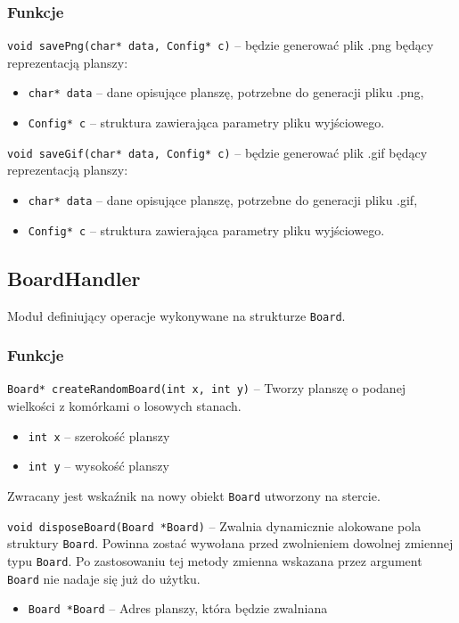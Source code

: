 \documentclass{mwart}
\begin{document}
\subsubsection{Funkcje}
\texttt{void savePng(char* data, Config* c)} -- będzie generować plik .png będący reprezentacją planszy:
\begin{itemize}[label={}]
	\item \texttt{char* data} -- dane opisujące planszę, potrzebne do generacji pliku .png,
	\item \texttt{Config* c} -- struktura zawierająca parametry pliku wyjściowego.
\end{itemize}
	
\noindent{}\texttt{void saveGif(char* data, Config* c)} -- będzie generować plik .gif będący reprezentacją planszy:
\begin{itemize}[label={}]
	\item \texttt{char* data} -- dane opisujące planszę, potrzebne do generacji pliku .gif,
	\item \texttt{Config* c} -- struktura zawierająca parametry pliku wyjściowego.
\end{itemize}


\subsection{BoardHandler}
Moduł definiujący operacje wykonywane na strukturze \texttt{Board}.

\subsubsection{Funkcje}

\texttt{Board* createRandomBoard(int x, int y)} -- Tworzy planszę o podanej wielkości z komórkami o losowych stanach.
\begin{itemize}[label={}]
	\item \texttt{int x} -- szerokość planszy
	\item \texttt{int y} -- wysokość planszy
\end{itemize}
Zwracany jest wskaźnik na nowy obiekt \texttt{Board} utworzony na stercie.

\vspace{5mm}
\noindent{}\texttt{void disposeBoard(Board *Board)} -- Zwalnia dynamicznie alokowane pola struktury \texttt{Board}. Powinna zostać wywołana przed zwolnieniem dowolnej zmiennej typu \texttt{Board}. Po zastosowaniu tej metody zmienna wskazana przez argument \texttt{Board} nie nadaje się już do użytku.
\begin{itemize}[label={}]
	\item \texttt{Board *Board} -- Adres planszy, która będzie zwalniana
\end{itemize}
\end{document}

